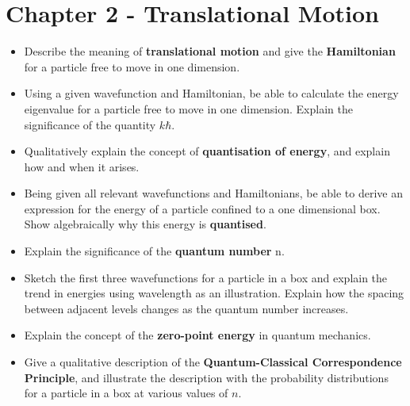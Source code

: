 \documentclass{memoir}[11pt,oneside,a4paper,openany]
\begin{document}
\section*{Chapter 2 - Translational Motion}
\begin{itemize}
	\item Describe the meaning of \textbf{translational motion} and give the \textbf{Hamiltonian} for a particle free to move in one dimension.
	\item Using a given wavefunction and Hamiltonian, be able to calculate the energy eigenvalue for a particle free to move in one dimension. Explain the significance of the quantity $k\hbar$.
	\item Qualitatively explain the concept of \textbf{quantisation of energy}, and explain how and when it arises.
	\item Being given all relevant wavefunctions and Hamiltonians, be able to derive an expression for the energy of a particle confined to a one dimensional box. Show algebraically why this energy is \textbf{quantised}.
	\item Explain the significance of the \textbf{quantum number} n.
	\item Sketch the first three wavefunctions for a particle in a box and explain the trend in energies using wavelength as an illustration. Explain how the spacing between adjacent levels changes as the quantum number increases.
	\item Explain the concept of the \textbf{zero-point energy} in quantum mechanics.
	\item Give a qualitative description of the \textbf{Quantum-Classical Correspondence Principle}, and illustrate the description with the probability distributions for a particle in a box at various values of $n$. 
\end{itemize}
\end{document}
